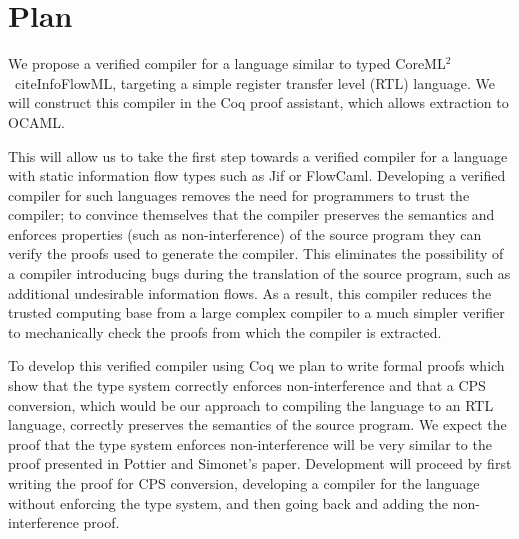 \section{Plan}

We propose a verified compiler for a language similar to typed CoreML$^2$\
cite{InfoFlowML}, targeting a simple register transfer level (RTL) language.  
We will construct this compiler in the Coq proof assistant\cite{coqart}, 
which allows extraction to OCAML\cite{berghofer2004extracting}.

This will allow us to take the first step towards a verified compiler
for a language with static information flow types such as
Jif\cite{myers1999jflow} or
FlowCaml\cite{simonet2003flow,simonet2003flowmanual}.  Developing a
verified compiler for such languages removes the need for programmers to
trust the compiler; to convince themselves that the compiler preserves 
the semantics and enforces properties (such as non-interference) of the 
source program they can verify the proofs used to generate
the compiler.  This eliminates the possibility of a compiler
introducing bugs during the translation of the source program, such
as additional undesirable information flows.  As a result, this compiler
reduces the trusted computing base from a large complex compiler to a
much simpler verifier to mechanically check the proofs from which 
the compiler is extracted.

To develop this verified compiler using Coq we plan to write formal
proofs which show that the type system correctly enforces non-interference
and that a CPS conversion\cite{appel2007compiling}, which would be our
approach to compiling the language to an RTL language, correctly
preserves the semantics of the source program.  We expect the proof
that the type system enforces non-interference will be very similar to
the proof presented in Pottier and Simonet's paper\cite{InfoFlowML}.
Development will proceed by first writing the proof for CPS conversion,
developing a compiler for the language without enforcing the type
system, and then going back and adding the non-interference proof.

